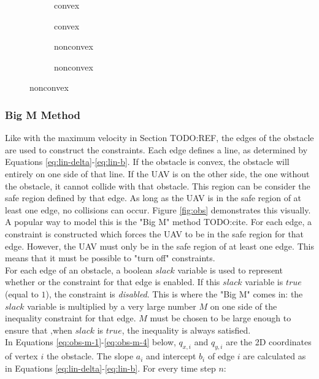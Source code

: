 \begin{figure}[]
    \centering
    
    \begin{subfigure}[]{0.47\textwidth}
        convex
        \caption{convex}
        \label{fig:convex-example}
    \end{subfigure}
    \hfil
    \begin{subfigure}[]{0.47\textwidth}
        nonconvex
        \caption{nonconvex}
        \label{fig:nonconvex-example}
    \end{subfigure}
\end{figure}


\subsubsection{Big M Method}
Like with the maximum velocity in Section TODO:REF, the edges of the obstacle are used to construct the constraints. Each edge defines a line, as determined by Equations \ref{eq:lin-delta}-\ref{eq:lin-b}. If the obstacle is convex, the obstacle will entirely on one side of that line. If the UAV is on the other side, the one without the obstacle, it cannot collide with that obstacle. This region can be consider the safe region defined by that edge. As long as the UAV is in the safe region of at least one edge, no collisions can occur. Figure \ref{fig:obs} demonstrates this visually. \\
A popular way to model this is the "Big M" method TODO:cite. For each edge, a constraint is constructed which forces the UAV to be in the safe region for that edge. However, the UAV must only be in the safe region of at least one edge. This means that it must be possible to "turn off" constraints. \\
For each edge of an obstacle, a boolean $slack$ variable is used to represent whether or the constraint for that edge is enabled. If this $slack$ variable is $true$ (equal to $1$), the constraint is \emph{disabled}. This is where the "Big M" comes in: the $slack$ variable is multiplied by a very large number $M$ on one side of the inequality constraint for that edge. $M$ must be chosen to be large enough to ensure that ,when $slack$ is $true$, the inequality is always satisfied. \\
In Equations \ref{eq:obs-m-1}-\ref{eq:obs-m-4} below, $q_{x,i}$ and $q_{y,i}$ are the 2D coordinates of vertex $i$ the obstacle. The slope $a_{i}$ and intercept $b_{i}$ of edge $i$ are calculated as in Equations \ref{eq:lin-delta}-\ref{eq:lin-b}. For every time step $n$:
